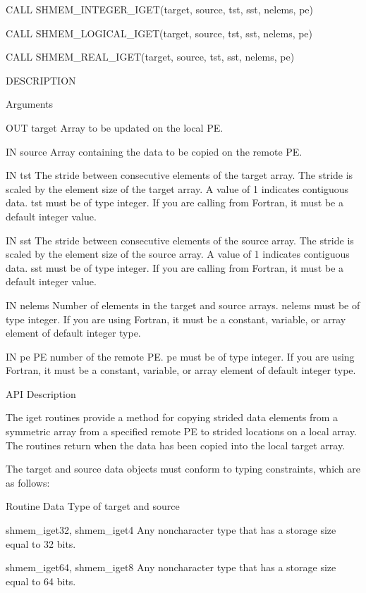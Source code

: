 	  CALL SHMEM_INTEGER_IGET(target, source, tst, sst, nelems, pe)

	  CALL SHMEM_LOGICAL_IGET(target, source, tst, sst, nelems, pe)

	  CALL SHMEM_REAL_IGET(target, source, tst, sst, nelems, pe)

DESCRIPTION

Arguments

	OUT       target	 Array to be updated on the local PE.

       IN	source	 Array containing the data to be copied on the remote PE.

       IN	tst	 The  stride between consecutive elements of the target array.
		 The stride is scaled by the element size of the target array.
		 A  value of 1 indicates contiguous data.  tst must be of type
		 integer.  If you are calling  from  Fortran,  it  must	 be  a
		 default integer value.

       IN	sst	 The  stride between consecutive elements of the source array.
		 The stride is scaled by the element size of the source array.
		 A  value of 1 indicates contiguous data.  sst must be of type
		 integer.  If you are calling  from  Fortran,  it  must	 be  a
		 default integer value.

       IN	nelems	 Number of elements in the target and source arrays.  nelems must
		 be of type integer.  If you are using Fortran, it must	 be  a
		 constant, variable, or array element of default integer type.

       IN	pe	 PE number of the remote PE.  pe must be of type integer.   If
		 you  are  using  Fortran, it must be a constant, variable, or
		 array element of default integer type.

API Description

       The iget routines provide  a method  for  copying strided data elements from a
       symmetric array from a specified remote PE to strided locations on a local  array.
       The routines return when the data has been copied into the local target
       array.


       The target and source data objects must conform to typing  constraints,
       which are as follows:

       Routine			     Data Type of target and source

       shmem_iget32, shmem_iget4     Any  noncharacter type that has a storage
				     size equal to 32 bits.

       shmem_iget64, shmem_iget8     Any noncharacter type that has a  storage
				     size equal to 64 bits.

